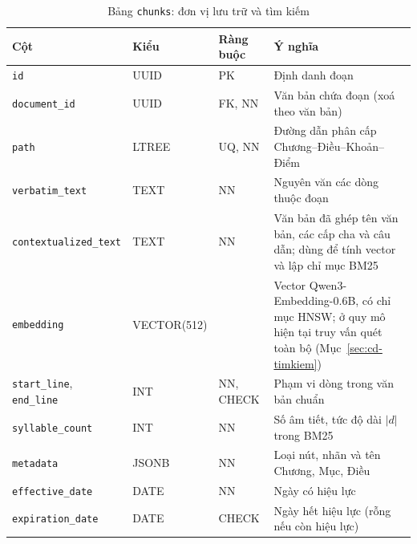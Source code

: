 \begin{table}[H]
\centering
\caption{Bảng \texttt{chunks}: đơn vị lưu trữ và tìm kiếm}
\label{tab:db-chunks}
\footnotesize
\setlength{\tabcolsep}{3pt}
\begin{tabularx}{\textwidth}{@{}l l l X@{}}
\toprule
\textbf{Cột} & \textbf{Kiểu} & \textbf{Ràng buộc} & \textbf{Ý nghĩa} \\
\midrule
\texttt{id} & UUID & PK & Định danh đoạn \\
\texttt{document\_id} & UUID & FK, NN & Văn bản chứa đoạn (xoá theo văn bản) \\
\texttt{path} & LTREE & UQ, NN & Đường dẫn phân cấp Chương--Điều--Khoản--Điểm \\
\texttt{verbatim\_text} & TEXT & NN & Nguyên văn các dòng thuộc đoạn \\
\texttt{contextualized\_text} & TEXT & NN & Văn bản đã ghép tên văn bản, các cấp cha và câu dẫn; dùng để tính vector và lập chỉ mục BM25 \\
\texttt{embedding} & VECTOR(512) & & Vector Qwen3-Embedding-0.6B, có chỉ mục HNSW; ở quy mô hiện tại truy vấn quét toàn bộ (Mục~\ref{sec:cd-timkiem}) \\
\texttt{start\_line}, \texttt{end\_line} & INT & NN, CHECK & Phạm vi dòng trong văn bản chuẩn \\
\texttt{syllable\_count} & INT & NN & Số âm tiết, tức độ dài $|d|$ trong BM25 \\
\texttt{metadata} & JSONB & NN & Loại nút, nhãn và tên Chương, Mục, Điều \\
\texttt{effective\_date} & DATE & NN & Ngày có hiệu lực \\
\texttt{expiration\_date} & DATE & CHECK & Ngày hết hiệu lực (rỗng nếu còn hiệu lực) \\
\bottomrule
\end{tabularx}
\end{table}

